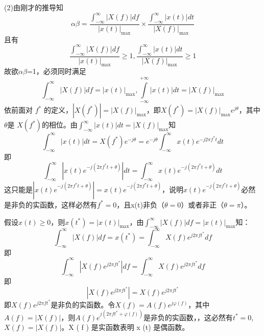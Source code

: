 \documentclass[utf8]{article}
\begin{document}
(2)由刚才的推导知 
$$\alpha \beta= \frac{ \int_{- \infty}^{ \infty} \left| X \left( f \right) \right| df}{ \left| x \left( t \right) \right|_{ \max}} \times \frac{ \int_{- \infty}^{ \infty} \left| x \left( t \right) \right| dt}{ \left| X \left( f \right) \right|_{ \max}}$$
且有
$$\frac{ \int_{- \infty}^{ \infty} \left| X \left( f \right) \right| df}{ \left| x \left( t \right) \right|_{ \max}} \geq 1, \frac{ \int_{- \infty}^{ \infty} \left| x \left( t \right) \right| dt}{ \left| X \left( f \right) \right|_{ \max}} \geq 1$$
故欲$\alpha \beta$=1，必须同时满足 
$$\int_{- \infty}^{ \infty} \left| X \left( f \right) \right| df= \left| x \left( t \right) \right|_{ \max} ,
 \int \limits_{-\infty}^{+ \infty} \left| x \left( t \right) \right| dt= \left| X \left( f \right) \right|_{ \max}$$
依前面对 $f^{*}$ 的定义，$\left|X \left( f^{*} \right) \right|= \left|X \left( f \right) \right|_{ \max}$，即$X \left( f^{*} \right)= \left|X \left( f \right) \right|_{ \max}e^{j \theta}$，其中$\theta$是 $X\left(f^{*}\right)$的相位。由$\int_{- \infty}^{ \infty} \left| x \left( t \right) \right| dt= \left| X \left( f \right) \right|_{ \max}$知
$$\int_{-\infty}^{ \infty} \left| x \left( t \right) \right| dt=X \left( f^{*} \right) e^{-j \theta}=e^{-j \theta} \int_{- \infty}^{ \infty}x \left( t \right) e^{-j2 \pi f^{*}t}dt$$
即
$$\int_{-\infty}^{ \infty} \left| x \left( t \right) e^{-j \left( 2 \pi f^{*}t+ \theta \right)} \right| dt= \int_{- \infty}^{ \infty}x \left( t \right) e^{-j \left( 2 \pi f^{*}t+ \theta \right)}dt$$
这只能是$\left|x \left( t \right) e^{-j \left( 2 \pi f^{*}t+ \theta \right)} \right|=x \left( t \right) e^{-j \left( 2 \pi f^{*}t+ \theta \right)}$，说明$x \left( t \right) e^{-j \left( 2 \pi f^{*}t+ \theta \right)}$必然是非负的实函数，这样必然有$f^{*} =0$，且x(t)非负（$ \theta=0$）或者非正（$\theta= \pi $）。

假设$x \left( t \right) \geq 0$，则$x \left( t^{*} \right)= \left| x \left( t \right) \right|_{ \max}$，由$\int_{- \infty}^{ \infty} \left| X \left( f \right) \right| df= \left| x \left( t \right) \right|_{ \max}$知： 
$$\int_{-\infty}^{ \infty} \left| X \left( f \right) \right| df=x \left( t^{*} \right)= \int_{- \infty}^{ \infty}X \left( f \right) e^{j2 \pi ft^{*}}df$$
即
$$\int_{- \infty}^{ \infty} \left| X \left( f \right) e^{j2 \pi ft^{*}} \right| df= \int_{- \infty}^{ \infty}X \left( f \right) e^{j2 \pi ft^{*}}df$$
即
$$\left|X \left( f \right) e^{j2 \pi ft^{*}} \right|=X \left( f \right) e^{j2 \pi ft^{*}}$$
即$X \left( f \right) e^{j2 \pi ft^{*}}$是非负的实函数。令$X \left( f \right)=A \left( f \right) e^{j \varphi \left( f \right)}$，其中 $A \left( f \right)= \left| X \left( f \right) \right|$，则$A\left( f \right) e^{j \left( 2 \pi ft^{*}+ \varphi \left( f \right) \right)}$是非负的实函数，，这必然有$t^{*}=0$,$X \left( f \right)= \left| X \left( f \right) \right|$。X ( f ) 是实函数表明 x (t) 是偶函数。
\end{document}
